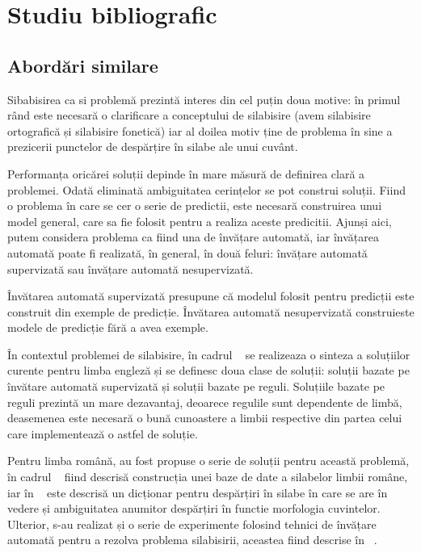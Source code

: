 \chapter{Studiu bibliografic}
\label{cap:studiu-bibliografic}

\section{Abordări similare}

Sibabisirea ca si problemă prezintă interes din cel puțin doua motive: în primul rând este necesară o clarificare a conceptului de silabisire (avem silabisire ortografică și silabisire fonetică) iar al doilea motiv ține de problema în sine a prezicerii punctelor de despărțire în silabe ale unui cuvânt. 

Performanța oricărei soluții depinde în mare măsură de definirea clară a problemei. Odată eliminată ambiguitatea cerințelor se pot construi soluții. Fiind o problema în care se cer o serie de predictii, este necesară construirea unui model general, care sa fie folosit pentru a realiza aceste predicitii. Ajunși aici, putem considera problema ca fiind una de învățare automată, iar învățarea automată poate fi realizată, în general, în două feluri: învățare automată supervizată sau învățare automată nesupervizată. 

Învătarea automată supervizată presupune că modelul folosit pentru predicții este construit din exemple de predicție. Învătarea automată nesupervizată construieste modele de predicție fără a avea exemple. 

În contextul problemei de silabisire, în cadrul ~\cite{bib:marchand2009automatic} se realizeaza o sinteza a soluțiilor curente pentru limba engleză și se definesc doua clase de soluții: soluții bazate pe învătare automată supervizată și soluții bazate pe reguli. Soluțiile bazate pe reguli prezintă un mare dezavantaj, deoarece regulile sunt dependente de limbă, deasemenea este necesară o bună cunoastere a limbii respective din partea celui care implementează o astfel de soluție.

Pentru limba română, au fost propuse o serie de soluții pentru această problemă, în cadrul ~\cite{bib:dinu2004despartirea} fiind descrisă construcția unei baze de date a silabelor limbii române, iar în ~\cite{bib:barbu2008romanian} este descrisă un dicționar pentru despărțiri în silabe în care se are în vedere și ambiguitatea anumitor despărțiri în functie morfologia cuvintelor. Ulterior, s-au realizat și o serie de experimente folosind tehnici de învățare automată pentru a rezolva problema silabisirii, aceastea fiind descrise în ~\cite{bib:dinu2013romanian}.


